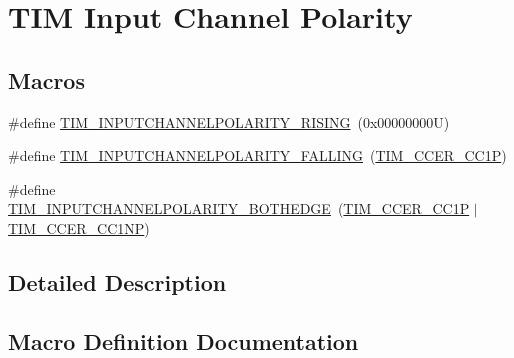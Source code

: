 \hypertarget{group___t_i_m___input___channel___polarity}{}\section{T\+IM Input Channel Polarity}
\label{group___t_i_m___input___channel___polarity}
\subsection*{Macros}
\begin{DoxyCompactItemize}
\item 
\#define \hyperlink{group___t_i_m___input___channel___polarity_ga4f4cede88a4ad4b33e81f2567e9bb08f}{T\+I\+M\+\_\+\+I\+N\+P\+U\+T\+C\+H\+A\+N\+N\+E\+L\+P\+O\+L\+A\+R\+I\+T\+Y\+\_\+\+R\+I\+S\+I\+NG}~(0x00000000\+U)
\item 
\#define \hyperlink{group___t_i_m___input___channel___polarity_ga07441a8c0a52234e30f471c23803450c}{T\+I\+M\+\_\+\+I\+N\+P\+U\+T\+C\+H\+A\+N\+N\+E\+L\+P\+O\+L\+A\+R\+I\+T\+Y\+\_\+\+F\+A\+L\+L\+I\+NG}~(\hyperlink{group___peripheral___registers___bits___definition_ga0ca0aedba14241caff739afb3c3ee291}{T\+I\+M\+\_\+\+C\+C\+E\+R\+\_\+\+C\+C1P})
\item 
\#define \hyperlink{group___t_i_m___input___channel___polarity_gaab2598881d1f19158e77723c5d29d6ac}{T\+I\+M\+\_\+\+I\+N\+P\+U\+T\+C\+H\+A\+N\+N\+E\+L\+P\+O\+L\+A\+R\+I\+T\+Y\+\_\+\+B\+O\+T\+H\+E\+D\+GE}~(\hyperlink{group___peripheral___registers___bits___definition_ga0ca0aedba14241caff739afb3c3ee291}{T\+I\+M\+\_\+\+C\+C\+E\+R\+\_\+\+C\+C1P} $\vert$ \hyperlink{group___peripheral___registers___bits___definition_ga403fc501d4d8de6cabee6b07acb81a36}{T\+I\+M\+\_\+\+C\+C\+E\+R\+\_\+\+C\+C1\+NP})
\end{DoxyCompactItemize}


\subsection{Detailed Description}


\subsection{Macro Definition Documentation}
\mbox{\label{group___t_i_m___input___channel___polarity_gaab2598881d1f19158e77723c5d29d6ac}} 
